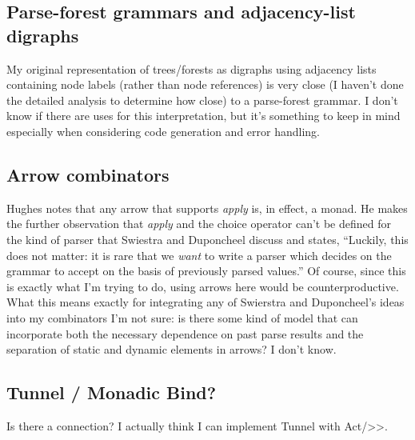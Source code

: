 \documentclass[12pt]{article}
\begin{document}
\subsection{Parse-forest grammars and adjacency-list digraphs}
\label{sec:parse-forest_grammars_adjacency-list_digraphs}

My original representation of trees/forests as digraphs using
adjacency lists containing node labels (rather than node references)
is very close (I haven't done the detailed analysis to determine how
close) to a parse-forest grammar.  I don't know if there are uses for
this interpretation, but it's something to keep in mind especially
when considering code generation and error handling.

\subsection{Arrow combinators}
\label{sec:arrow_combinators}

Hughes notes that any arrow that supports \emph{apply} is, in effect,
a monad.  He makes the further observation that \emph{apply} and the
choice operator can't be defined for the kind of parser that Swiestra
and Duponcheel discuss and states, ``Luckily, this does not matter: it
is rare that we \emph{want} to write a parser which decides on the
grammar to accept on the basis of previously parsed values.''  Of
course, since this is exactly what I'm trying to do, using arrows here
would be counterproductive.  What this means exactly for integrating
any of Swierstra and Duponcheel's ideas into my combinators I'm not
sure: is there some kind of model that can incorporate both the
necessary dependence on past parse results and the separation of
static and dynamic elements in arrows?  I don't know.

\subsection{Tunnel / Monadic Bind?}
\label{sec:tunnel_bind}

Is there a connection?  I actually think I can implement Tunnel with
Act/>>.

\printbibliography
\end{document}
